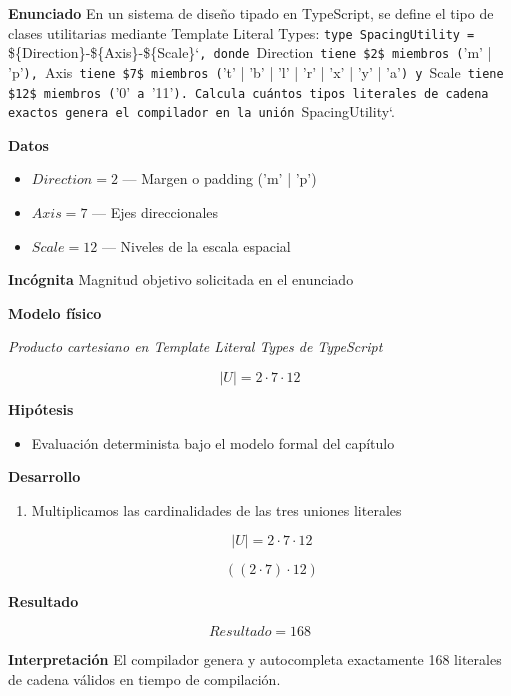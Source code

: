 \documentclass{book}
\begin{document}
\begin{tcolorbox}[title={Problema resuelto}, studiumworked, breakable]

\noindent\textbf{Enunciado}
En un sistema de diseño tipado en TypeScript, se define el tipo de clases utilitarias mediante Template Literal Types: \texttt{type SpacingUtility = }\$\{Direction\}-\$\{Axis\}-\$\{Scale\}`\texttt{, donde }Direction\texttt{ tiene \$2\$ miembros (}'m' | 'p'\texttt{), }Axis\texttt{ tiene \$7\$ miembros (}'t' | 'b' | 'l' | 'r' | 'x' | 'y' | 'a'\texttt{) y }Scale\texttt{ tiene \$12\$ miembros (}'0'\texttt{ a }'11'\texttt{). Calcula cu{\'a}ntos tipos literales de cadena exactos genera el compilador en la uni{\'o}n }SpacingUtility`.

\noindent\textbf{Datos}
\begin{itemize}
\item $Direction = 2$ — Margen o padding ('m' | 'p')
\item $Axis = 7$ — Ejes direccionales
\item $Scale = 12$ — Niveles de la escala espacial
\end{itemize}

\noindent\textbf{Incógnita}
Magnitud objetivo solicitada en el enunciado

\noindent\textbf{Modelo físico}

\noindent\textit{Producto cartesiano en Template Literal Types de TypeScript}

\[
|U| = 2 \cdot 7 \cdot 12
\]

\noindent\textbf{Hipótesis}
\begin{itemize}
\item Evaluación determinista bajo el modelo formal del capítulo
\end{itemize}

\noindent\textbf{Desarrollo}
\begin{enumerate}
\item
Multiplicamos las cardinalidades de las tres uniones literales

\[
|U| = 2 \cdot 7 \cdot 12
\]

\[
\left(\left(2\cdot 7\right)\cdot 12\right)
\]
\end{enumerate}

\noindent\textbf{Resultado}

\[
Resultado = 168
\]

\noindent\textbf{Interpretación}
El compilador genera y autocompleta exactamente 168 literales de cadena válidos en tiempo de compilación.


\end{tcolorbox}
\end{document}
